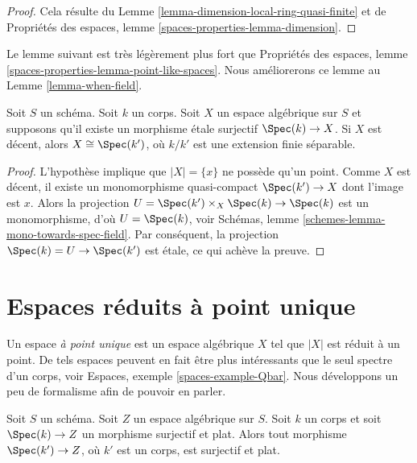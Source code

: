 \begin{proof}
Cela résulte du Lemme \ref{lemma-dimension-local-ring-quasi-finite}
et de Propriétés des espaces, lemme \ref{spaces-properties-lemma-dimension}.
\end{proof}

\noindent
Le lemme suivant est très légèrement plus fort que
Propriétés des espaces,
lemme \ref{spaces-properties-lemma-point-like-spaces}.
Nous améliorerons ce lemme au Lemme \ref{lemma-when-field}.

\begin{lemma}
\label{lemma-decent-point-like-spaces}
Soit $S$ un schéma. Soit $k$ un corps. Soit $X$ un espace algébrique
sur $S$ et supposons qu'il existe un morphisme \'etale surjectif
$\Spec(k) \to X$. Si $X$ est décent, alors $X \cong \Spec(k')$,
où $k/k'$ est une extension finie séparable.
\end{lemma}

\begin{proof}
L'hypothèse implique que $|X| = \{x\}$ ne possède qu'un point. Comme
$X$ est décent, il existe un monomorphisme quasi-compact
$\Spec(k') \to X$ dont l'image est $x$. Alors la projection
$U = \Spec(k') \times_X \Spec(k) \to \Spec(k)$
est un monomorphisme, d'où $U = \Spec(k)$, voir
Schémas, lemme \ref{schemes-lemma-mono-towards-spec-field}.
Par conséquent, la projection $\Spec(k) = U \to \Spec(k')$ est \'etale,
ce qui achève la preuve.
\end{proof}






\section{Espaces réduits à point unique}
\label{section-singleton}

\noindent
Un espace {\it à point unique} est un espace algébrique $X$ tel que $|X|$
est réduit à un point. De tels espaces peuvent en fait être plus
intéressants que le seul spectre d'un corps, voir
Espaces, exemple \ref{spaces-example-Qbar}.
Nous développons un peu de formalisme afin de pouvoir en parler.

\begin{lemma}
\label{lemma-flat-cover-by-field}
Soit $S$ un schéma. Soit $Z$ un espace algébrique sur $S$.
Soit $k$ un corps et soit $\Spec(k) \to Z$ un morphisme surjectif et plat.
Alors tout morphisme $\Spec(k') \to Z$, où $k'$ est un corps, est
surjectif et plat.
\end{lemma}

